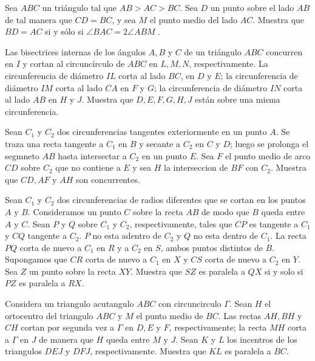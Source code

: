 \documentclass[11pt]{scrartcl}
\begin{document}
\begin{problem} [2007/6]
    Sea $ABC$ un triángulo tal que $AB > AC > BC$. Sea $D$ un punto sobre el lado $AB$ de tal
manera que $CD = BC$, y sea $M$ el punto medio del lado $AC$. Muestra que $BD = AC$ si
y sólo si $\angle BAC = 2\angle ABM$ .
\end{problem}
\begin{problem}[2008/6]
    Las bisectrices internas de los ángulos $A, B$ y $C$ de un triángulo $ABC$ concurren en $I$
y cortan al circuncírculo de $ABC$ en $L, M, N$, respectivamente. La circunferencia de
diámetro $IL$ corta al lado $BC$, en $D$ y $E$; la circunferencia de diámetro $IM$ corta al lado
$CA$ en $F$ y $G$; la circunferencia de diámetro $IN$ corta al lado $AB$ en $H$ y $J$. Muestra que
$D, E, F , G, H, J$ están sobre una misma circunferencia.
    
\end{problem}
\begin{problem}
[2010/3] Sean $C_1$ y $C_2$ dos circunferencias tangentes exteriormente en un punto $A$. Se traza una recta tangente a $C_1$ en $B$ y secante a $C_2$ en $C$ y $D$; luego se prolonga el segmneto $AB$ hasta intersectar a $C_2$ en un punto $E$. Sea $F$ el punto medio de arco $CD$ sobre $C_2$ que no contiene a $E$ y sea $H$ la interseccion de $BF$ con $C_2$. Muestra que $CD,AF$ y $AH$ son concurrentes.
\end{problem}

\begin{problem}
[2011/6] Sean $C_1$ y $C_2$ dos circunferencias de radios diferentes que se cortan en los puntos $A$ y $B$. Consideramos un punto $C$ sobre la recta $AB$ de modo que $B$ queda entre $A$ y $C$. Sean $P$ y $Q$ sobre $C_1$ y $C_2$, respectivamente, tales que $CP$ es tangente a $C_1$ y $CQ$ tangente a $C_2$. $P$ no esta adentro de $C_2$ y $Q$ no esta dentro de $C_1$. La recta $PQ$ corta de nuevo a $C_1$ en $R$ y a $C_2$ en $S$, ambos puntos distintos de $B$. Supongamos que $CR$ corta de nuevo a $C_1$ en $X$ y $CS$ corta de nuevo a $C_2$ en $Y$. Sea $Z$ un punto sobre la recta $XY$. Muestra que $SZ$ es paralela a $QX$ si y solo si $PZ$ es paralela a $RX$.
\end{problem}

\begin{problem}
[2012/6] Considera un triangulo acutangulo $ABC$ con circuncirculo $\Gamma$. Sean $H$ el ortocentro del triangulo $ABC$ y $M$ el punto medio de $BC$. Las rectas $AH,BH$ y $CH$ cortan por segunda vez a $\Gamma$ en $D,E$ y $F$, respectivamente; la recta $MH$ corta a $\Gamma$ en $J$ de manera que $H$ queda entre $M$ y $J$. Sean $K$ y $L$ los incentros de los triangulos $DEJ$ y $DFJ$, respectivamente. Muestra que $KL$ es paralela a $BC$. 
\end{problem}
\end{document}
